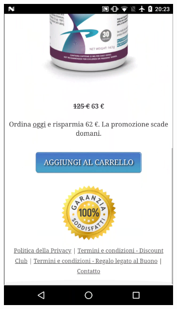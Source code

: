 \begin{figure}[h]
\begin{center}
\begin{subfigure}{.18\textwidth}
\begin{center}
        \includegraphics[scale=0.06]{figs/mobile_4}
        \caption{}
    \end{center}
    \end{subfigure}
    \begin{subfigure}{.18\textwidth} 
    \begin{center}

\end{center}
\end{subfigure}
\end{center}
\end{figure}
